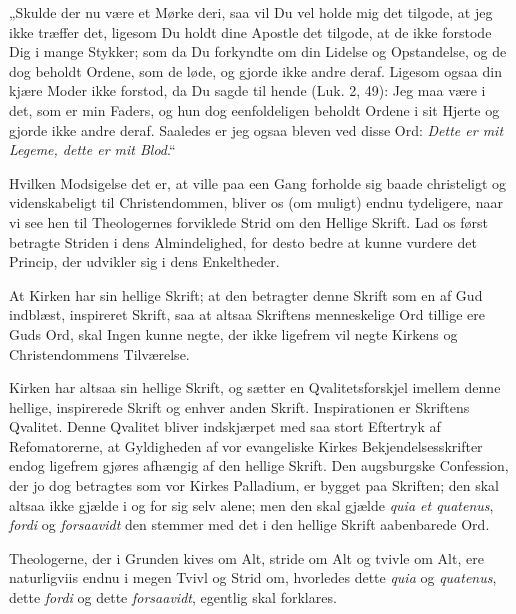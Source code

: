 \documentclass[12pt,a4paper]{book}
\newcommand{\opage}[1]{\marginnote{\footnotesize\textit{[#1]}}}
\begin{document}
„Skulde der nu være et Mørke deri, saa vil Du vel holde mig det
tilgode, at jeg ikke træffer det, ligesom Du holdt dine Apostle det
tilgode, at de ikke forstode Dig i mange Stykker; som da Du forkyndte
om din Lidelse og Opstandelse, og de dog beholdt Ordene, som de løde,
og gjorde ikke andre deraf. Ligesom ogsaa din kjære Moder ikke
forstod, da Du sagde til hende (Luk. 2, 49): Jeg maa være i det, som
er min Faders, og hun dog eenfoldeligen beholdt Ordene i sit Hjerte
og gjorde ikke andre deraf. Saaledes er jeg ogsaa bleven ved disse
Ord: \emph{Dette er mit Legeme, dette er mit Blod}.“

Hvilken Modsigelse det er, at ville paa een Gang forholde sig baade
christeligt og videnskabeligt til Christendommen, bliver os (om
muligt) endnu tydeligere, naar vi see hen til Theologernes forviklede
Strid om den Hellige Skrift. Lad os først betragte Striden i dens
Almindelighed, for desto bedre at kunne vurdere det Princip, der
udvikler sig i dens Enkeltheder.

At Kirken har sin hellige Skrift; at den betragter denne Skrift som
en af Gud indblæst, inspireret Skrift, saa at altsaa Skriftens
menneskelige Ord tillige ere Guds Ord, skal Ingen kunne negte, der
ikke ligefrem vil negte Kirkens og Christendommens Tilværelse.

Kirken har altsaa sin hellige Skrift, og sætter en Qvalitetsforskjel
imellem denne hellige, inspirerede Skrift og enhver anden
\opage{32} Skrift. Inspirationen er Skriftens Qvalitet. Denne Qvalitet bliver
indskjærpet med saa stort Eftertryk af Refomatorerne, at Gyldigheden
af vor evangeliske Kirkes Bekjendelsesskrifter endog ligefrem gjøres
afhængig af den hellige Skrift. Den augsburgske Confession, der jo
dog betragtes som vor Kirkes Palladium, er bygget paa Skriften; den
skal altsaa ikke gjælde i og for sig selv alene; men den skal gjælde
\textit{quia et quatenus}, \emph{fordi} og \emph{forsaavidt} den stemmer
med det i den hellige Skrift aabenbarede Ord.

Theologerne, der i Grunden kives om Alt, stride om Alt og tvivle om
Alt, ere naturligviis endnu i megen Tvivl og Strid om, hvorledes
dette \textit{quia} og \textit{quatenus}, dette \emph{fordi} og dette
\emph{forsaavidt}, egentlig skal forklares.
\end{document}
